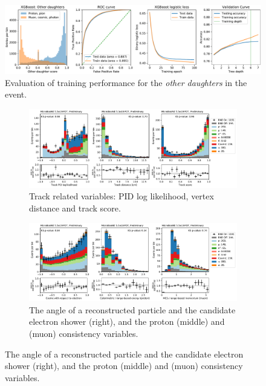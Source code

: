 \begin{figure}
\centering
\includegraphics[width=\textwidth]{NueCCsel/Images/training/daughter_bdt_test}
\caption[Evaluation of training performance for the other daughters in the event]{Evaluation of training performance for the \textit{other daughters} in the event.}
\label{fig:nuecc:train_d}
\end{figure}

\begin{figure}[htb] 
\begin{center}
    \begin{subfigure}{\textwidth}
    \centering
    \includegraphics[height=0.27\textheight]{NueCCsel/Images/datamc/pre_daughter_1}
    \caption{\label{fig:nuecc:other_cand1} Track related variables: PID log likelihood, vertex distance and track score.}
    \end{subfigure}
    \begin{subfigure}{\textwidth}
    \centering
    \includegraphics[height=0.27\textheight]{NueCCsel/Images/datamc/pre_daughter_2}
    \caption{\label{fig:nuecc:other_cand2} The angle of a reconstructed particle and the candidate electron shower (right), and the proton (middle) and (muon) consistency variables.}

\end{subfigure}
\end{center}
\end{figure}
